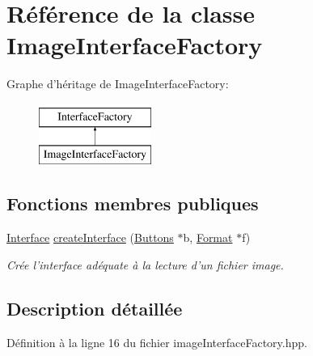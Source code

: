 \hypertarget{classImageInterfaceFactory}{\section{Référence de la classe Image\+Interface\+Factory}
\label{classImageInterfaceFactory}
}
Graphe d'héritage de Image\+Interface\+Factory\+:\begin{figure}[H]
\begin{center}
\leavevmode
\includegraphics[height=2.000000cm]{classImageInterfaceFactory}
\end{center}
\end{figure}
\subsection*{Fonctions membres publiques}
\begin{DoxyCompactItemize}
\item 
\hyperlink{classInterface}{Interface} \hyperlink{classImageInterfaceFactory_ace6a51fa023edcf9c99aee2a7e74ca5a}{create\+Interface} (\hyperlink{classButtons}{Buttons} $\ast$b, \hyperlink{classFormat}{Format} $\ast$f)
\begin{DoxyCompactList}\small\item\em Crée l'interface adéquate à la lecture d'un fichier image. \end{DoxyCompactList}\end{DoxyCompactItemize}


\subsection{Description détaillée}


Définition à la ligne 16 du fichier image\+Interface\+Factory.\+hpp.



